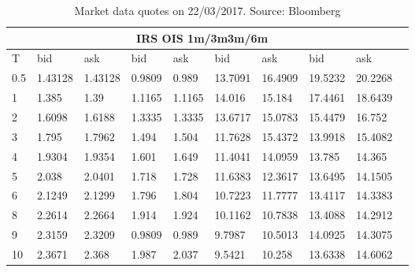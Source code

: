 \documentclass[12pt,a4paper]{article}
\theoremstyle{plain}
\numberwithin{equation}{section}
\begin{document}
\begin{table}[t]
\begin{center}
\begin{tabular}{|l|l|l|l|l|l|l|l|l|l|}

\hline
\multicolumn{9}{|c|}{IRS \;\;\;\; \;\;\;\;\;\;\;\;\;\;\;\;OIS \;\;\;\;\;\;\;\;\;\;\;\;\;\;\;\;\;1m/3m\;\;\;\;\;\;\;\;\;\;\;\;\;\;\;\;\;3m/6m} \\\hline
T& bid& ask& bid& ask& bid& ask& bid& ask\\ \hline

   0.5 & 1.43128 & 1.43128 & 0.9809 & 0.989 & 13.7091 & 16.4909 &19.5232 & 20.2268 \\
    1     & 1.385 & 1.39  & 1.1165 & 1.1165 & 14.016 & 15.184 & 17.4461 & 18.6439 \\
    2     & 1.6098 & 1.6188 & 1.3335 & 1.3335 & 13.6717 & 15.0783 & 15.4479 & 16.752 \\
    3     & 1.795 & 1.7962 & 1.494 & 1.504 & 11.7628 & 15.4372 & 13.9918 & 15.4082 \\
    4     & 1.9304 & 1.9354 & 1.601 & 1.649 & 11.4041 & 14.0959 & 13.785 & 14.365 \\
    5     & 2.038 & 2.0401 & 1.718 & 1.728 & 11.6383 & 12.3617 & 13.6495 & 14.1505 \\
    6     & 2.1249 & 2.1299 & 1.796 & 1.804 & 10.7223 & 11.7777 & 13.4117 & 14.3383 \\
    8     & 2.2614 & 2.2664 & 1.914 & 1.924 & 10.1162 & 10.7838 & 13.4088 & 14.2912 \\
    9     & 2.3159 & 2.3209 & 0.9809 & 0.989 & 9.7987 & 10.5013 & 14.0925 & 14.3075 \\
    10    & 2.3671 & 2.368 & 1.987 & 2.037 & 9.5421 & 10.258 & 13.6338 & 14.6062 \\
\hline
\end{tabular}\\[1ex]
\caption{Market data quotes on 22/03/2017. Source: Bloomberg }\label{Marketdata:20170322}
\end{center}
\end{table}
\end{document}
